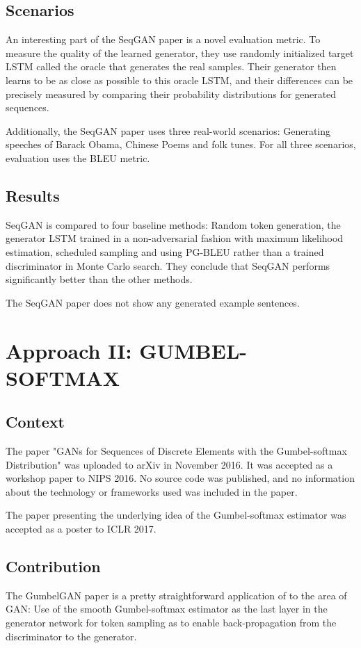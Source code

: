 \documentclass[a4paper,conference]{IEEEtran}
\begin{document}
\subsection{Scenarios}
An interesting part of the SeqGAN paper is a novel evaluation metric. To measure the quality of the learned generator, they use randomly initialized target LSTM called the oracle that generates the real samples. Their generator then learns to be as close as possible to this oracle LSTM, and their differences can be precisely measured by comparing their probability distributions for generated sequences. 

Additionally, the SeqGAN paper uses three real-world scenarios: Generating speeches of Barack Obama, Chinese Poems and folk tunes. For all three scenarios, evaluation uses the BLEU metric.

\subsection{Results}
SeqGAN is compared to four baseline methods: Random token generation, the generator LSTM trained in a non-adversarial fashion with maximum likelihood estimation, scheduled sampling \cite{c12} and using PG-BLEU rather than a trained discriminator in Monte Carlo search. They conclude that SeqGAN performs significantly better than the other methods. 

The SeqGAN paper does not show any generated example sentences.

\section{Approach II: GUMBEL-SOFTMAX}
\subsection{Context}
The paper "GANs for Sequences of Discrete Elements
with the Gumbel-softmax Distribution" \cite{c13} was uploaded to arXiv in November 2016. It was accepted as a workshop paper to NIPS 2016. No source code was published, and no information about the technology or frameworks used was included in the paper. 

The paper presenting the underlying idea of the Gumbel-softmax estimator \cite{c14} was accepted as a poster to ICLR 2017.

\subsection{Contribution}
The GumbelGAN paper \cite{c13} is a pretty straightforward application of \cite{c14} to the area of GAN: Use of the smooth Gumbel-softmax estimator as the last layer in the generator network for token sampling as to enable back-propagation from the discriminator to the generator.
\end{document}
